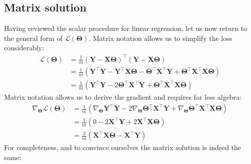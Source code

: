 \documentclass[12pt,initial,twoside,maitrise]{dms}
\numberwithin{equation}{section}
\numberwithin{table}{chapter}
\numberwithin{figure}{chapter}
\begin{document}
\subsection{Matrix solution}

Having reviewed the scalar procedure for linear regression, let us now return to the general form of $\mathcal L(\mathbf{\Theta})$. Matrix notation allows us to simplify the loss considerably:
%
\begin{align}
\mathcal L(\mathbf{\Theta}) & = \frac{1}{m} (\mathbf Y - \mathbf X \mathbf \Theta)^\intercal(\mathbf Y - \mathbf X \mathbf \Theta) \\ &= \frac{1}{m} (\mathbf Y^\intercal \mathbf Y - \mathbf Y^\intercal \mathbf X \mathbf \Theta - \mathbf \Theta^\intercal \mathbf X^\intercal \mathbf Y + \mathbf \Theta^\intercal \mathbf X^\intercal \mathbf X \mathbf \Theta) \\ &= \frac{1}{m} (\mathbf Y^\intercal \mathbf Y - 2 \mathbf \Theta^\intercal \mathbf X^\intercal \mathbf Y + \mathbf \Theta^\intercal \mathbf X^\intercal \mathbf X \mathbf \Theta)
\end{align}
%
Matrix notation allows us to derive the gradient and requires far less algebra:
%
\begin{align}
\nabla_{\mathbf{\Theta}}\mathcal L(\mathbf{\Theta}) & = \frac{1}{m} (\nabla_{\mathbf{\Theta}}\mathbf Y^\intercal \mathbf Y - 2 \nabla_{\mathbf{\Theta}} \mathbf \Theta^\intercal \mathbf X^\intercal \mathbf Y + \nabla_{\mathbf{\Theta}}\mathbf \Theta^\intercal \mathbf X^\intercal \mathbf X \mathbf \Theta) \\ & = \frac{1}{m} ( 0 - 2\mathbf{X}^\intercal \mathbf Y + 2 \mathbf{X}^\intercal \mathbf X \mathbf \Theta ) \\ & = \boxed{\frac{2}{m} (\mathbf{X}^\intercal \mathbf X \mathbf \Theta - \mathbf{X}^\intercal \mathbf Y)}
\end{align}
%
For completeness, and to convince ourselves the matrix solution is indeed the same:
%
\end{document}
